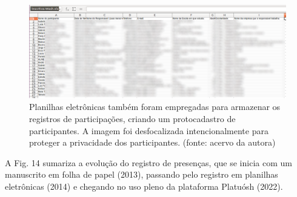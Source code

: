 \documentclass[
12pt,		%
openright,	%
twoside,  %
a4paper,			%
chapter=TITLE,		%
english,			%
french,				%
spanish,			%
brazil				%
]{USPSC-classe/USPSC}
\begin{document}
\begin{figure}[max size={\textwidth}{\textheight}]
\hspace{0.5cm}
\begin{minipage}[b]{0.4\linewidth}
        \centering
                \includegraphics[width=1.0\linewidth]{../../imagens/blurred-planilha2.png}
                \caption{Planilhas eletr\^onicas tamb\'em foram empregadas para armazenar os registros de participa\c{c}\~oes, criando um protocadastro de participantes. A imagem foi desfocalizada intencionalmente para proteger a privacidade dos participantes. (fonte: acervo da autora)}
                \label{b43907f0fa6b6fb935e7384ab03b508859ff0609}
\end{minipage}%
\hspace{0.5cm}
\end{figure}



A Fig. 14 sumariza a evolu\c{c}\~ao do registro de presen\c{c}as, que se inicia com um manuscrito em folha de papel (2013), passando pelo registro em planilhas eletr\^onicas (2014) e chegando no uso pleno da plataforma Platu\'osh (2022).
\end{document}
